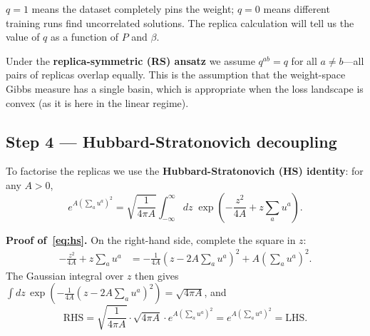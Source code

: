 \documentclass[nobib,justified]{tufte-handout}
\begin{document}
\begin{keyresult}
$q=1$ means the dataset completely pins the weight; $q=0$ means
different training runs find uncorrelated solutions.  The replica
calculation will tell us the value of $q$ as a function of $P$ and
$\beta$.
\end{keyresult}

Under the \textbf{replica-symmetric (RS) ansatz} we assume
$q^{ab}=q$ for all $a\neq b$---all pairs of replicas overlap equally.
This is the assumption that the weight-space Gibbs measure has a single
basin, which is appropriate when the loss landscape is convex (as it is
here in the linear regime).

\subsection*{Step 4 --- Hubbard-Stratonovich decoupling}

To factorise the replicas we use the \textbf{Hubbard-Stratonovich (HS)
identity}: for any $A>0$,
\begin{equation}
  e^{A\left(\sum_a u^a\right)^2}
  = \sqrt{\frac{1}{4\pi A}}
    \int_{-\infty}^{\infty}dz\;
    \exp\!\left(-\frac{z^2}{4A} + z\sum_a u^a\right).
  \label{eq:hs}
\end{equation}

\noindent\textbf{Proof of~\eqref{eq:hs}.}
On the right-hand side, complete the square in $z$:
\begin{align}
  -\frac{z^2}{4A} + z\sum_a u^a
  &= -\frac{1}{4A}\!\left(z - 2A\sum_a u^a\right)^2
    + A\!\left(\sum_a u^a\right)^2.
  \label{eq:hsproof1}
\end{align}
The Gaussian integral over $z$ then gives
$\int dz\,\exp\!\left(-\frac{1}{4A}(z-2A\sum_a u^a)^2\right) =
\sqrt{4\pi A}$, and
\begin{equation}
  \text{RHS} = \sqrt{\frac{1}{4\pi A}}\cdot\sqrt{4\pi A}\cdot
  e^{A(\sum_a u^a)^2} = e^{A(\sum_a u^a)^2} = \text{LHS}.
  \label{eq:hsproof2}
\end{equation}
\end{document}
